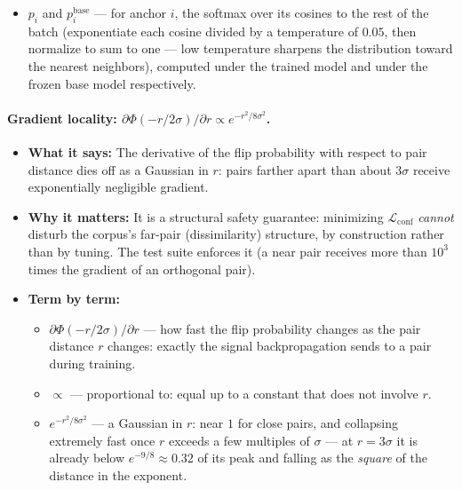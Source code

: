 \documentclass[11pt,letterpaper]{article}
\begin{document}
\begin{itemize}
\begin{itemize}
    the standard measure of how much a distribution $q$ misrepresents a
    reference distribution $p$; zero exactly when they agree, larger the
    more they differ. The double bar $\|$ is part of the notation and
    separates reference from candidate.
    \item $p_i$ and $p_i^{\mathrm{base}}$ --- for anchor $i$, the softmax
    over its cosines to the rest of the batch (exponentiate each cosine
    divided by a temperature of $0.05$, then normalize to sum to one ---
    low temperature sharpens the distribution toward the nearest
    neighbors), computed under the trained model and under the frozen base
    model respectively.
  \end{itemize}
\end{itemize}

\paragraph{Gradient locality: $\partial \Phi(-r/2\sigma) / \partial r
\propto e^{-r^2 / 8\sigma^2}$.}
\begin{itemize}
  \item \textbf{What it says:} The derivative of the flip probability with
  respect to pair distance dies off as a Gaussian in $r$: pairs farther
  apart than about $3\sigma$ receive exponentially negligible gradient.
  \item \textbf{Why it matters:} It is a structural safety guarantee:
  minimizing $\mathcal L_{\mathrm{conf}}$ \emph{cannot} disturb the
  corpus's far-pair (dissimilarity) structure, by construction rather than
  by tuning. The test suite enforces it (a near pair receives more than
  $10^3$ times the gradient of an orthogonal pair).
  \item \textbf{Term by term:}
  \begin{itemize}
    \item $\partial \Phi(-r/2\sigma) / \partial r$ --- how fast the flip
    probability changes as the pair distance $r$ changes: exactly the
    signal backpropagation sends to a pair during training.
    \item $\propto$ --- proportional to: equal up to a constant that does
    not involve $r$.
    \item $e^{-r^2/8\sigma^2}$ --- a Gaussian in $r$: near $1$ for close
    pairs, and collapsing extremely fast once $r$ exceeds a few multiples
    of $\sigma$ --- at $r = 3\sigma$ it is already below $e^{-9/8} \approx
    0.32$ of its peak and falling as the \emph{square} of the distance in
    the exponent.
  \end{itemize}
\end{itemize}
\end{document}
